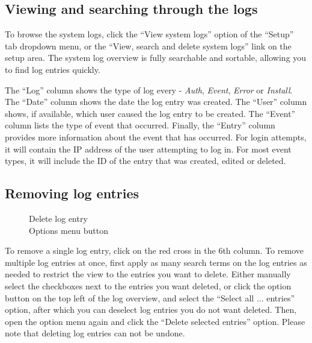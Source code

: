 \documentclass[a4paper,oneside,openany,12pt]{memoir}
\begin{document}
\subsection{Viewing and searching through the logs}
To browse the system logs, click the ``View system logs'' option of the ``Setup'' tab dropdown menu, or the ``View, search and delete system logs'' link on the setup area.
The system log overview is fully searchable and sortable, allowing you to find log entries quickly.
\par
The ``Log'' column shows the type of log every - \emph{Auth}, \emph{Event}, \emph{Error} or \emph{Install}.
The ``Date'' column shows the date the log entry was created.
The ``User'' column shows, if available, which user caused the log entry to be created.
The ``Event'' column lists the type of event that occurred.
Finally, the ``Entry'' column provides more information about the event that has occurred.
For login attempts, it will contain the IP address of the user attempting to log in.
For most event types, it will include the ID of the entry that was created, edited or deleted.



\subsection{Removing log entries}
\begin{figure} %
  \vspace{-26pt}
  \begin{framed}
     Delete log entry\\
     Options menu button
  \end{framed}
\end{figure}
To remove a single log entry, click on the red cross in the 6th column.
To remove multiple log entries at once, first apply as many search terms on the log entries as needed to restrict the view to the entries you want to delete.
Either manually select the checkboxes next to the entries you want deleted, or click the option button on the top left of the log overview, and select the ``Select all ... entries'' option, after which you can deselect log entries you do not want deleted.
Then, open the option menu again and click the ``Delete selected entries'' option.
Please note that deleting log entries can not be undone.
\end{document}
